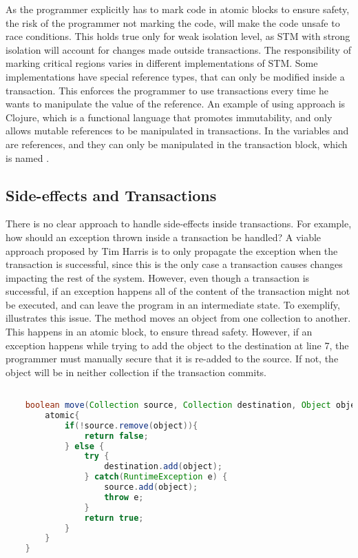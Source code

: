 As the programmer explicitly has to mark code in atomic blocks to ensure safety, the risk of the programmer not marking the code, will make the code unsafe to race conditions. This holds true only for weak isolation level, as \ac{STM} with strong isolation will account for changes made outside transactions. The responsibility of marking critical regions varies in different implementations of \ac{STM}. Some implementations have special reference types, that can only be modified inside a transaction. This enforces the programmer to use transactions every time he wants to manipulate the value of the reference. An example of using approach is Clojure, which is a functional language that promotes immutability, and only allows mutable references to be manipulated in transactions. In  the variables  and  are references, and they can only be manipulated in the transaction block, which is named .


\subsection{Side-effects and Transactions}
There is no clear approach to handle side-effects inside transactions. For example, how should an exception thrown inside a transaction be handled? A viable approach proposed by Tim Harris\cite{harris2005exceptions} is to only propagate the exception when the transaction is successful, since this is the only case a transaction causes changes impacting the rest of the system. However, even though a transaction is successful, if an exception happens all of the content of the transaction might not be executed, and can leave the program in an intermediate state. To exemplify,  illustrates this issue. The method  moves an object from one collection to another. This happens in an atomic block, to ensure thread safety. However, if an exception happens while trying to add the object to the destination at line 7, the programmer must manually secure that it is re-added to the source. If not, the object will be in neither collection if the transaction commits. 

\begin{lstlisting}[label=lst:stm_exception,
  caption={Exceptions in Transactions},
  language=Java,  
  showspaces=false,
  showtabs=false,
  breaklines=true,
  showstringspaces=false,
  breakatwhitespace=true,
  commentstyle=\color{greencomments},
  keywordstyle=\color{bluekeywords},
  stringstyle=\color{redstrings},
  morekeywords={atomic, retry, orElse}]  % Start your code-block

	boolean move(Collection source, Collection destination, Object object){
		atomic{
			if(!source.remove(object)){
				return false;
			} else {
				try { 
					destination.add(object);
				} catch(RuntimeException e) {
					source.add(object);
					throw e;
				}
				return true;
			}
		}
	}
       
\end{lstlisting}

